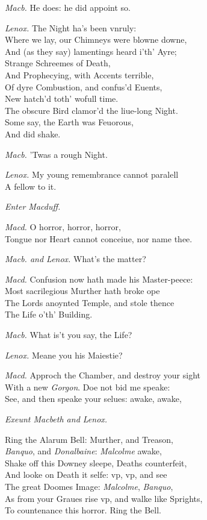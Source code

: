 \documentclass[12pt]{sides}
\newcommand{\clStageDir}[1]{\hspace*{\fill}\textit{#1}\hspace*{\fill}}
\newcommand{\elStageDir}[1]{\hfill\textit{#1}}
\newcommand{\dia}[1]{\hskip 15pt\textit{#1}\hskip 6pt}
\begin{document}
\begin{multicols}{2}
            \dia{Macb.} He does: he did appoint so.

            \dia{Lenox.} The Night ha's been vnruly: \\ Where we lay, our Chimneys were blowne downe, \\ And (as they say) lamentings heard i'th' Ayre; \\ Strange Schreemes of Death, \\ And Prophecying, with Accents terrible, \\ Of dyre Combustion, and confus'd Euents, \\ New hatch'd toth' wofull time. \\ The obscure Bird clamor'd the liue-long Night. \\ Some say, the Earth was Feuorous, \\ And did shake.

            \dia{Macb.} 'Twas a rough Night. %

            \dia{Lenox.} My young remembrance cannot paralell \\ A fellow to it.

            \clStageDir{Enter Macduff.}

            \dia{Macd.} O horror, horror, horror, \\ Tongue nor Heart cannot conceiue, nor name thee.

            \dia{Macb. and Lenox.} What's the matter?

            \dia{Macd.} Confusion now hath made his Master-peece: \\ Most sacrilegious Murther hath broke ope \\ The Lords anoynted Temple, and stole thence \\ The Life o'th' Building.

            \dia{Macb.} What is't you say, the Life?

            \dia{Lenox.} Meane you his Maiestie?

            \dia{Macd.} Approch the Chamber, and destroy your sight \\ With a new \textit{Gorgon}. Doe not bid me speake: \\ See, and then speake your selues: awake, awake,

            \elStageDir{Exeunt Macbeth and Lenox.}

            Ring the Alarum Bell: Murther, and Treason, \\ \textit{Banquo}, and \textit{Donalbaine}: \textit{Malcolme} awake, \\ Shake off this Downey sleepe, Deaths counterfeit, \\ And looke on Death it selfe: vp, vp, and see \\ The great Doomes Image: \textit{Malcolme}, \textit{Banquo}, \\ As from your Graues rise vp, and walke like Sprights, \\ To countenance this horror. Ring the Bell.


\end{multicols}
\end{document}
